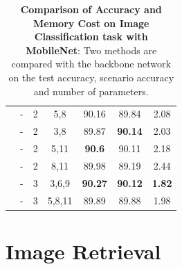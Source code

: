 \begin{table}[]
\begin{center}
\begin{tabular}{c||c|c|c||c|c|c}
\cline{2-7} 
& - & 2 & 5,8 & 90.16 & 89.84 & 2.08 \\ 
\cline{2-7} 
& - & 2 & 3,8 & 89.87 & \textbf{90.14} & 2.03 \\ 
\cline{2-7} 
& - & 2 & 5,11 & \textbf{90.6} & 90.11 & 2.18 \\ 
\cline{2-7} 
& - & 2 & 8,11 & 89.98 & 89.19 & 2.44 \\ 
\cline{2-7} 
& - & 3 & 3,6,9 & \textbf{90.27} & \textbf{90.12} & \textbf{1.82} \\ 
\cline{2-7} 
& - & 3 & 5,8,11 & 89.89 & 89.88 & 1.98                                                                   
\end{tabular}
\end{center}
\caption[Comparison of Accuracy and Memory Cost on Image Classification task with MobileNet]{\textbf{Comparison of Accuracy and Memory Cost on Image Classification task with MobileNet}: Two methods are compared with the backbone network on the test accuracy, scenario accuracy and number of parameters.}
\label{ic-mobilenetcifar10}
\end{table}


\section{Image Retrieval}

